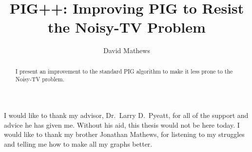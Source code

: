 \documentclass[12pt]{thesis}
\title{PIG++: Improving PIG to Resist the Noisy-TV Problem}
\author{David Mathews}
\begin{document}
\maketitle

\makecopyright %

\preliminaries

\begin{abstract}
I present an improvement to the standard PIG algorithm to make it less prone to the Noisy-TV problem.
\end{abstract}

\begin{acknowledgments}
  I would like to thank my advisor, Dr.\ Larry D.\ Pyeatt, for all of the support and advice he has given me. Without his aid, this thesis would not be here today. I would like to thank my brother Jonathan Mathews, for listening to my struggles and telling me how to make all my graphs better.
\end{acknowledgments}


%
%





\end{document}

